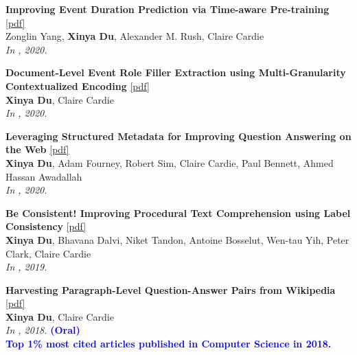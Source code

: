 \begin{enumerate}[{[}1{]},leftmargin=*]
\item
{\bf Improving Event Duration Prediction via Time-aware Pre-training}
\href{https://aclanthology.org/2020.findings-emnlp.302.pdf}{{[pdf]}} \\
{Zonglin Yang, \textbf{Xinya Du}, Alexander M. Rush, Claire Cardie} \\
{\it In \EMNLPfinding, 2020.}\\

\item
{\bf Document-Level Event Role Filler Extraction using Multi-Granularity Contextualized Encoding}
\href{https://aclanthology.org/2020.acl-main.714.pdf}{{[pdf]}} \\
{\textbf{Xinya Du}, Claire Cardie} \\
{\it In \ACL, 2020.}\\

\item
{\bf Leveraging Structured Metadata for Improving Question Answering on the Web}
\href{https://aclanthology.org/2020.aacl-main.55.pdf}{{[pdf]}} \\
{\textbf{Xinya Du}, Adam Fourney, Robert Sim, Claire Cardie, Paul Bennett, Ahmed Hassan Awadallah} \\
{\it In \AACL, 2020.}\\

\item
{\bf Be Consistent! Improving Procedural Text Comprehension using Label Consistency}
\href{https://aclanthology.org/N19-1244.pdf}{{[pdf]}} \\
{\textbf{Xinya Du}, Bhavana Dalvi, Niket Tandon, Antoine Bosselut, Wen-tau Yih, Peter Clark, Claire Cardie} \\
{\it In \NAACL, 2019.}\\

\item
{\bf Harvesting Paragraph-Level Question-Answer Pairs from Wikipedia}
\href{https://aclanthology.org/P18-1177.pdf}{{[pdf]}} \\
{{\bf Xinya Du}, Claire Cardie} \\
{\it In \ACL, 2018.} {\textcolor{blue}{\textbf{(Oral)}}}  \\
{\textcolor{blue}{\textbf{Top 1\% most cited articles published in Computer Science in 2018.}}} \\


\end{enumerate}
